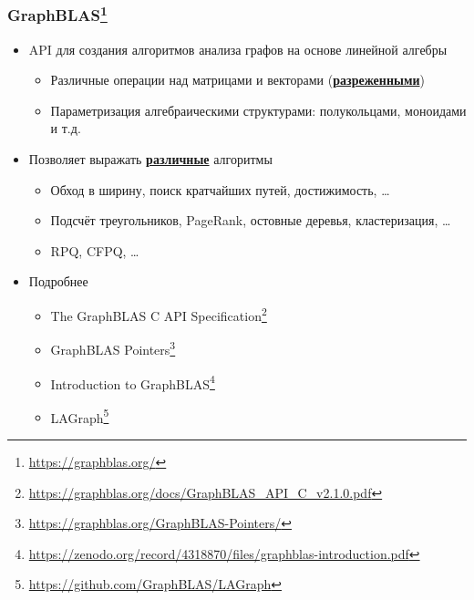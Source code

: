 \documentclass[xcolor=table,aspectratio=169]{beamer}
\begin{document}
\begin{frame}[fragile]
  \frametitle{GraphBLAS\footnote{\url{https://graphblas.org/}}}
  \begin{itemize}
    \item API для создания алгоритмов анализа графов на основе линейной алгебры 
    \begin{itemize}
      \item Различные операции над матрицами и векторами (\underline{\textbf{разреженными}})
      \item Параметризация алгебраическими структурами: полукольцами, моноидами и т.д.
    \end{itemize}
    \pause
    \item Позволяет выражать \underline{\textbf{различные}} алгоритмы
    \begin{itemize}
      \item Обход в ширину, поиск кратчайших путей, достижимость, \ldots
      \item Подсчёт треугольников, PageRank, остовные деревья, кластеризация, \ldots
      \item RPQ, CFPQ, \ldots
    \end{itemize}
    \pause
    \item Подробнее
    \begin{itemize}
      \item The GraphBLAS C API Specification\footnote{\url{https://graphblas.org/docs/GraphBLAS_API_C_v2.1.0.pdf}}
      \item GraphBLAS Pointers\footnote{\url{https://graphblas.org/GraphBLAS-Pointers/}}
      \item Introduction to GraphBLAS\footnote{\url{https://zenodo.org/record/4318870/files/graphblas-introduction.pdf}}
      \item LAGraph\footnote{\url{https://github.com/GraphBLAS/LAGraph}}
    \end{itemize}
    \end{itemize}
\end{frame}
\end{document}
